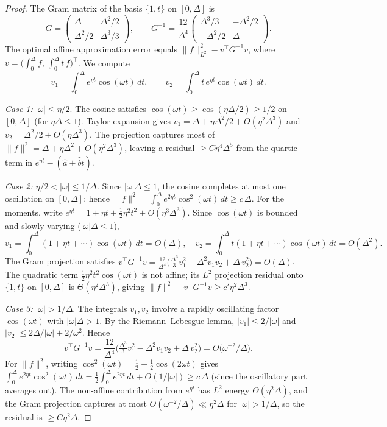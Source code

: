 \begin{proof}
The Gram matrix of the basis $\{1,t\}$ on $[0,\Delta]$ is
\[
G = \begin{pmatrix} \Delta & \Delta^2/2 \\ \Delta^2/2 & \Delta^3/3 \end{pmatrix},
\qquad
G^{-1} = \frac{12}{\Delta^4}
\begin{pmatrix} \Delta^3/3 & -\Delta^2/2 \\ -\Delta^2/2 & \Delta \end{pmatrix}.
\]
The optimal affine approximation error equals
$\|f\|_{L^2}^2 - v^\top G^{-1} v$,
where $v = \bigl(\int_0^\Delta f,\, \int_0^\Delta t\,f\bigr)^\top$.
We compute
\[
v_1=\int_0^\Delta e^{\eta t}\cos(\omega t)\,dt,
\qquad
v_2=\int_0^\Delta t\,e^{\eta t}\cos(\omega t)\,dt.
\]

\textit{Case 1:} $|\omega|\le\eta/2$.
The cosine satisfies $\cos(\omega t)\ge\cos(\eta\Delta/2)\ge 1/2$ on
$[0,\Delta]$ (for $\eta\Delta\le 1$).
Taylor expansion gives $v_1=\Delta+\eta\Delta^2/2+O(\eta^2\Delta^3)$
and $v_2=\Delta^2/2+O(\eta\Delta^3)$.
The projection captures most of $\|f\|^2=\Delta+\eta\Delta^2+O(\eta^2\Delta^3)$,
leaving a residual $\ge C\eta^4\Delta^5$
from the quartic term in $e^{\eta t}-(\hat a+\hat b t)$.

\textit{Case 2:} $\eta/2<|\omega|\le 1/\Delta$.
Since $|\omega|\Delta\le 1$, the cosine completes at most one oscillation on
$[0,\Delta]$; hence $\|f\|^2=\int_0^\Delta e^{2\eta t}\cos^2(\omega t)\,dt\ge c\,\Delta$.
For the moments, write $e^{\eta t}=1+\eta t+\tfrac12\eta^2t^2+O(\eta^3\Delta^3)$.
Since $\cos(\omega t)$ is bounded and slowly varying ($|\omega|\Delta\le 1$),
\[
v_1=\int_0^\Delta (1+\eta t+\cdots)\cos(\omega t)\,dt = O(\Delta),
\quad
v_2=\int_0^\Delta t(1+\eta t+\cdots)\cos(\omega t)\,dt = O(\Delta^2).
\]
The Gram projection satisfies
$v^\top G^{-1}v
=\frac{12}{\Delta^4}\bigl(\tfrac{\Delta^3}{3}v_1^2
-\Delta^2 v_1 v_2+\Delta\,v_2^2\bigr)
=O(\Delta)$.
The quadratic term $\tfrac12\eta^2 t^2\cos(\omega t)$ is not affine;
its $L^2$ projection residual onto $\{1,t\}$ on $[0,\Delta]$ is
$\Theta(\eta^2\Delta^3)$, giving
$\|f\|^2-v^\top G^{-1}v\ge c'\eta^2\Delta^3$.

\textit{Case 3:} $|\omega|>1/\Delta$.
The integrals $v_1,v_2$ involve a rapidly oscillating factor
$\cos(\omega t)$ with $|\omega|\Delta>1$.
By the Riemann--Lebesgue lemma,
$|v_1|\le 2/|\omega|$ and $|v_2|\le 2\Delta/|\omega|+2/\omega^2$.
Hence
\[
v^\top G^{-1}v
=\frac{12}{\Delta^4}\bigl(\tfrac{\Delta^3}{3}v_1^2
-\Delta^2 v_1 v_2+\Delta\,v_2^2\bigr)
=O\bigl(\omega^{-2}/\Delta\bigr).
\]
For $\|f\|^2$, writing $\cos^2(\omega t)=\tfrac12+\tfrac12\cos(2\omega t)$
gives $\int_0^\Delta e^{2\eta t}\cos^2(\omega t)\,dt
=\tfrac12\int_0^\Delta e^{2\eta t}\,dt+O(1/|\omega|)
\ge c\,\Delta$
(since the oscillatory part averages out).
The non-affine contribution from $e^{\eta t}$ has
$L^2$ energy $\Theta(\eta^2\Delta)$, and the Gram projection captures
at most $O(\omega^{-2}/\Delta)\ll\eta^2\Delta$ for $|\omega|>1/\Delta$,
so the residual is $\ge C\eta^2\Delta$.
\end{proof}

